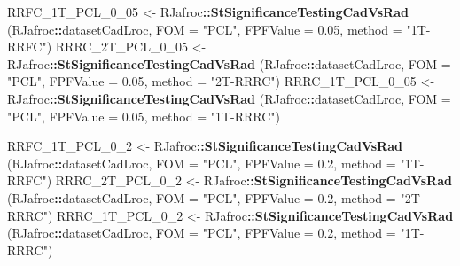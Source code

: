 \documentclass[
]{book}
\newenvironment{Shaded}{\begin{snugshade}}{\end{snugshade}}
\newcommand{\DataTypeTok}[1]{\textcolor[rgb]{0.13,0.29,0.53}{#1}}
\newcommand{\DecValTok}[1]{\textcolor[rgb]{0.00,0.00,0.81}{#1}}
\newcommand{\FloatTok}[1]{\textcolor[rgb]{0.00,0.00,0.81}{#1}}
\newcommand{\KeywordTok}[1]{\textcolor[rgb]{0.13,0.29,0.53}{\textbf{#1}}}
\newcommand{\NormalTok}[1]{#1}
\newcommand{\OperatorTok}[1]{\textcolor[rgb]{0.81,0.36,0.00}{\textbf{#1}}}
\newcommand{\StringTok}[1]{\textcolor[rgb]{0.31,0.60,0.02}{#1}}
\begin{document}
\begin{Shaded}
\begin{Highlighting}[]
\NormalTok{RRFC_1T_PCL_}\DecValTok{0}\NormalTok{_}\DecValTok{05}\NormalTok{ <-}\StringTok{ }\NormalTok{RJafroc}\OperatorTok{::}\KeywordTok{StSignificanceTestingCadVsRad}\NormalTok{ (RJafroc}\OperatorTok{::}\NormalTok{datasetCadLroc, }
\DataTypeTok{FOM =} \StringTok{"PCL"}\NormalTok{, }\DataTypeTok{FPFValue =} \FloatTok{0.05}\NormalTok{, }\DataTypeTok{method =} \StringTok{"1T-RRFC"}\NormalTok{)}
\NormalTok{RRRC_2T_PCL_}\DecValTok{0}\NormalTok{_}\DecValTok{05}\NormalTok{ <-}\StringTok{ }\NormalTok{RJafroc}\OperatorTok{::}\KeywordTok{StSignificanceTestingCadVsRad}\NormalTok{ (RJafroc}\OperatorTok{::}\NormalTok{datasetCadLroc, }
\DataTypeTok{FOM =} \StringTok{"PCL"}\NormalTok{, }\DataTypeTok{FPFValue =} \FloatTok{0.05}\NormalTok{, }\DataTypeTok{method =} \StringTok{"2T-RRRC"}\NormalTok{)}
\NormalTok{RRRC_1T_PCL_}\DecValTok{0}\NormalTok{_}\DecValTok{05}\NormalTok{ <-}\StringTok{ }\NormalTok{RJafroc}\OperatorTok{::}\KeywordTok{StSignificanceTestingCadVsRad}\NormalTok{ (RJafroc}\OperatorTok{::}\NormalTok{datasetCadLroc, }
\DataTypeTok{FOM =} \StringTok{"PCL"}\NormalTok{, }\DataTypeTok{FPFValue =} \FloatTok{0.05}\NormalTok{, }\DataTypeTok{method =} \StringTok{"1T-RRRC"}\NormalTok{)}

\NormalTok{RRFC_1T_PCL_}\DecValTok{0}\NormalTok{_}\DecValTok{2}\NormalTok{ <-}\StringTok{ }\NormalTok{RJafroc}\OperatorTok{::}\KeywordTok{StSignificanceTestingCadVsRad}\NormalTok{ (RJafroc}\OperatorTok{::}\NormalTok{datasetCadLroc, }
\DataTypeTok{FOM =} \StringTok{"PCL"}\NormalTok{, }\DataTypeTok{FPFValue =} \FloatTok{0.2}\NormalTok{, }\DataTypeTok{method =} \StringTok{"1T-RRFC"}\NormalTok{)}
\NormalTok{RRRC_2T_PCL_}\DecValTok{0}\NormalTok{_}\DecValTok{2}\NormalTok{ <-}\StringTok{ }\NormalTok{RJafroc}\OperatorTok{::}\KeywordTok{StSignificanceTestingCadVsRad}\NormalTok{ (RJafroc}\OperatorTok{::}\NormalTok{datasetCadLroc, }
\DataTypeTok{FOM =} \StringTok{"PCL"}\NormalTok{, }\DataTypeTok{FPFValue =} \FloatTok{0.2}\NormalTok{, }\DataTypeTok{method =} \StringTok{"2T-RRRC"}\NormalTok{)}
\NormalTok{RRRC_1T_PCL_}\DecValTok{0}\NormalTok{_}\DecValTok{2}\NormalTok{ <-}\StringTok{ }\NormalTok{RJafroc}\OperatorTok{::}\KeywordTok{StSignificanceTestingCadVsRad}\NormalTok{ (RJafroc}\OperatorTok{::}\NormalTok{datasetCadLroc, }
\DataTypeTok{FOM =} \StringTok{"PCL"}\NormalTok{, }\DataTypeTok{FPFValue =} \FloatTok{0.2}\NormalTok{, }\DataTypeTok{method =} \StringTok{"1T-RRRC"}\NormalTok{)}


\end{Highlighting}
\end{Shaded}
\end{document}
